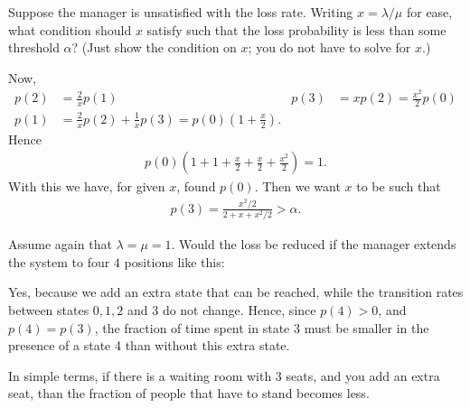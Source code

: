 \begin{exercise}[201807] 
Suppose the manager is unsatisfied with the loss rate. Writing $x=\lambda/\mu$ for ease, what condition should $x$ satisfy such that the loss probability is less than some threshold $\alpha$? (Just show the condition on $x$; you do not have to solve for $x$.) 
\begin{solution}
 Now, 
 \begin{align*}
 p(2) &= \frac 2 x p(1) & p(3) &= x p(2)= \frac{x^2}2 p(0) \\
p(1)&=\frac 2 x p(2) + \frac 1 x p(3) = p(0)(1+\frac x 2).
 \end{align*}
Hence
\begin{align*}
 p(0) (1+1 + \frac x 2 + \frac x 2 + \frac{x^2} 2) =1.
\end{align*}
With this we have, for given $x$, found $p(0)$. Then we want $x$ to be such that
\begin{align*}
 p(3) = \frac{x^2/2}{2 + x + x^2/2} > \alpha.
\end{align*}

\end{solution}
\end{exercise}


\begin{exercise}
 Assume again that $\lambda=\mu=1$. Would the loss be reduced if the manager extends the system to four $4$ positions like this:
\begin{center}
\end{center}
\begin{solution}
Yes, because we add an extra state that can be reached, while the transition rates between states $0, 1, 2$ and $3$ do not change. Hence, since $p(4)>0$, and $p(4)=p(3)$, the fraction of time spent in state 3 must be smaller in the presence of a state 4 than without this extra state. 

In simple terms, if there is a waiting room with 3 seats, and you add an extra seat, than the fraction of people that have to stand becomes less. 
\end{solution}
\end{exercise}


